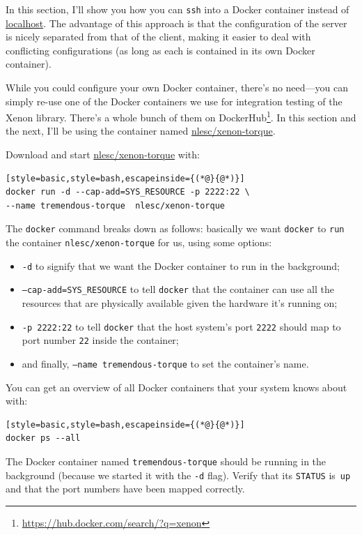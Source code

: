 \documentclass[12pt, a4paper, twoside, openany, titlepage]{book}
\begin{document}
In this section, I'll show you how you can \texttt{ssh} into a Docker container instead of \url{localhost}. The advantage of this approach is that the configuration of the server is nicely separated from that of the client, making it easier to deal with conflicting configurations (as long as each is contained in its own Docker container).

While you could configure your own Docker container, there's no need---you can simply re-use one of the Docker containers we use for integration testing of the Xenon library. There's a whole bunch of them on DockerHub\footnote{\url{https://hub.docker.com/search/?q=xenon}}. In this section and the next, I'll be using the container named \url{nlesc/xenon-torque}.

Download and start \url{nlesc/xenon-torque} with:
\begin{lstlisting}[style=basic,style=bash,escapeinside={(*@}{@*)}]
docker run -d --cap-add=SYS_RESOURCE -p 2222:22 \
--name tremendous-torque  nlesc/xenon-torque
\end{lstlisting}

The \texttt{docker} command breaks down as follows: basically we want \texttt{docker} to \texttt{run} the container \texttt{nlesc/xenon-torque} for us, using some options:
\begin{itemize}
\item{\texttt{-d} to signify that we want the Docker container to run in the background;}
\item{\texttt{--cap-add=SYS\_RESOURCE} to tell \texttt{docker} that the container can use all the resources that are physically available given the hardware it's running on;}
\item{\texttt{-p 2222:22} to tell \texttt{docker} that the host system's port \texttt{2222} should map to port number \texttt{22} inside the container;}
\item{and finally, \texttt{--name tremendous-torque} to set the container's name.}
\end{itemize}


You can get an overview of all Docker containers that your system knows about with:
\begin{lstlisting}[style=basic,style=bash,escapeinside={(*@}{@*)}]
docker ps --all
\end{lstlisting}
The Docker container named \texttt{tremendous-torque} should be running in the background (because we started it with the \texttt{-d} flag). Verify that its \texttt{STATUS} is~\texttt{up} and that the port numbers have been mapped correctly.
\end{document}
